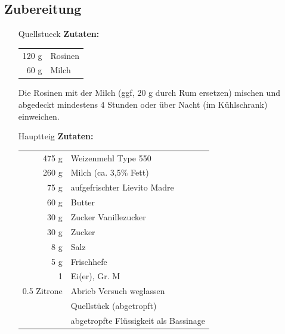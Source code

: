 \subsection*{Zubereitung}
\begin{enumerate}
    \item [\Gls{Quellstueck}] \textbf{Zutaten:}\\
        \begin{tabular}{r l}
            120 g  & Rosinen  \\
            60 g &  Milch  
        \end{tabular}
        
        Die Rosinen mit der Milch (ggf, 20 g durch Rum ersetzen) mischen und abgedeckt mindestens 4 Stunden oder über Nacht (im Kühlschrank) einweichen.
    \item  [\Gls{Hauptteig}] \textbf{Zutaten:}\\
        \begin{tabular}{r l}
            475 g & Weizenmehl Type 550                   \\
            260 g & Milch (ca. 3,5\% Fett)                \\
            75 g & aufgefrischter Lievito Madre          \\
            60 g & Butter                                \\
            30 g & Zucker Vanillezucker                  \\
            30 g & Zucker                                \\
            8 g & Salz                                  \\
            5 g & Frischhefe                            \\
            1 & Ei(er), Gr. M                         \\
            0.5 Zitrone & Abrieb Versuch weglassen              \\
            & Quellstück (abgetropft)               \\
            & abgetropfte Flüssigkeit als Bassinage
        \end{tabular}
        

\end{enumerate}
